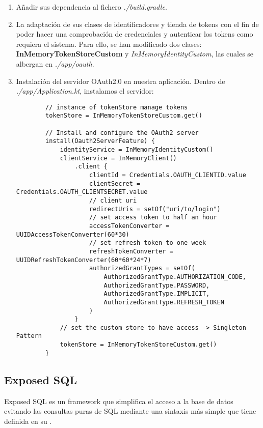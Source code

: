 \begin{enumerate}
    \item Añadir sus dependencia al fichero \textit{./build.gradle}.
    \item La adaptación de sus clases de identificadores y tienda de tokens con el fin de poder hacer una comprobación de credenciales y autenticar los tokens como requiera el sistema. Para ello, se han modificado dos clases: \textbf{InMemoryTokenStoreCustom} y \textit{InMemoryIdentityCustom}, las cuales se albergan en \textit{./app/oauth}.
    \item Instalación del servidor OAuth2.0 en nuestra aplicación.
    Dentro de \textit{./app/Application.kt}, instalamos el servidor:

    \begin{lstlisting}
        // instance of tokenStore manage tokens
        tokenStore = InMemoryTokenStoreCustom.get()
        
        // Install and configure the OAuth2 server
        install(Oauth2ServerFeature) {
            identityService = InMemoryIdentityCustom()
            clientService = InMemoryClient()
                .client {
                    clientId = Credentials.OAUTH_CLIENTID.value
                    clientSecret = Credentials.OAUTH_CLIENTSECRET.value
                    // client uri
                    redirectUris = setOf("uri/to/login")
                    // set access token to half an hour
                    accessTokenConverter = UUIDAccessTokenConverter(60*30)
                    // set refresh token to one week
                    refreshTokenConverter = UUIDRefreshTokenConverter(60*60*24*7)
                    authorizedGrantTypes = setOf(
                        AuthorizedGrantType.AUTHORIZATION_CODE,
                        AuthorizedGrantType.PASSWORD,
                        AuthorizedGrantType.IMPLICIT,
                        AuthorizedGrantType.REFRESH_TOKEN
                    )
                }
            // set the custom store to have access -> Singleton Pattern
            tokenStore = InMemoryTokenStoreCustom.get()
        }
    \end{lstlisting}
\end{enumerate}



    \subsection{Exposed SQL}

Exposed SQL es un framework que simplifica el acceso a la base de datos evitando las consultas puras de SQL mediante una sintaxis más simple que tiene definida en su .~\cite{exposedsql}

